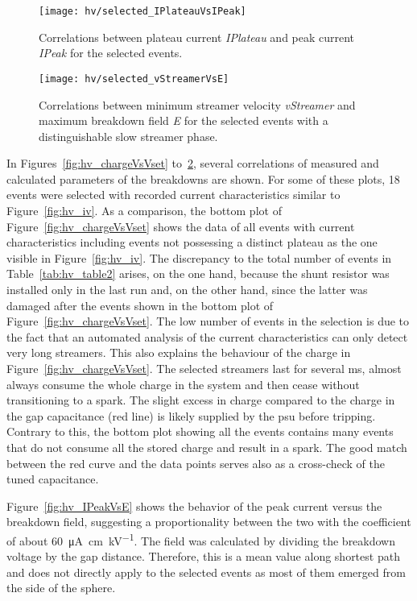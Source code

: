 \begin{figure}[p]
	\centering
	\texttt{[image: hv/selected\_IPlateauVsIPeak]}
	\caption{Correlations between plateau current \emph{IPlateau} and peak current \emph{IPeak} for the selected events.}
	\label{fig:hv_IPlateauVsIPeak}
\end{figure}

\begin{figure}[p]
	\centering
	\texttt{[image: hv/selected\_vStreamerVsE]}
	\caption{Correlations between minimum streamer velocity \emph{vStreamer} and maximum breakdown field \emph{E} for the selected events with a distinguishable slow streamer phase.}
	\label{fig:hv_vStreamerVsE}
\end{figure}

In Figures~\ref{fig:hv_chargeVsVset} to~\ref{fig:hv_vStreamerVsE}, several correlations of measured and calculated parameters of the breakdowns are shown.
For some of these plots, \num{18} events were selected with recorded current characteristics similar to Figure~\ref{fig:hv_iv}.
As a comparison, the bottom plot of Figure~\ref{fig:hv_chargeVsVset} shows the data of all events with current characteristics including events not possessing a distinct plateau as the one visible in Figure~\ref{fig:hv_iv}.
The discrepancy to the total number of events in Table~\ref{tab:hv_table2} arises, on the one hand, because the shunt resistor was installed only in the last run and, on the other hand, since the latter was damaged after the events shown in the bottom plot of Figure~\ref{fig:hv_chargeVsVset}.
The low number of events in the selection is due to the fact that an automated analysis of the current characteristics can only detect very long streamers.
This also explains the behaviour of the charge in Figure~\ref{fig:hv_chargeVsVset}.
The selected streamers last for several \si{\milli\second}, almost always consume the whole charge in the system and then cease without transitioning to a spark.
The slight excess in charge compared to the charge in the gap capacitance (red line) is likely supplied by the \gls{psu} before tripping.
Contrary to this, the bottom plot showing all the events contains many events that do not consume all the stored charge and result in a spark.
The good match between the red curve and the data points serves also as a cross-check of the tuned capacitance.

Figure~\ref{fig:hv_IPeakVsE} shows the behavior of the peak current versus the breakdown field, suggesting a proportionality between the two with the coefficient of about \SI{60}{\micro\ampere\centi\metre\per\kilo\volt}.
The field was calculated by dividing the breakdown voltage by the gap distance.
Therefore, this is a mean value along shortest path and does not directly apply to the selected events as most of them emerged from the side of the sphere.


